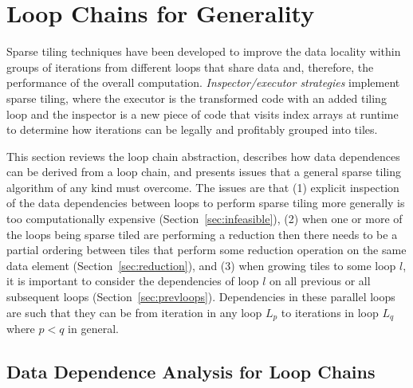 \section{Loop Chains for Generality}
\label{sec:loopchain}


Sparse tiling techniques have been developed 
to improve the data locality within groups
    of iterations from different loops that share data and,
therefore, the performance of the overall computation.  {\em
  Inspector/executor strategies} implement sparse
tiling, where the executor is the transformed code with an added
tiling loop and the inspector is a new piece of code that visits index
arrays at runtime to determine how iterations can be legally and
profitably grouped into tiles.



This section reviews the loop chain abstraction,
describes how data dependences can be
derived from a loop chain, 
and presents issues that a general sparse tiling
algorithm of any kind must overcome.
The issues are that 
 (1) explicit inspection of the data dependencies
between loops to perform sparse tiling more generally is too 
computationally expensive (Section~\ref{sec:infeasible}),
 (2) when one or more of the loops being sparse 
tiled are performing
a reduction then there needs to be a partial ordering 
between tiles that perform
some reduction operation on the same data element (Section~\ref{sec:reduction}), 
and (3) when growing tiles to some loop $l$, 
it is important to consider
the dependencies of loop $l$ on all previous or all subsequent loops
(Section~\ref{sec:prevloops}). 
Dependencies in these parallel loops are such that they can be from 
iteration in any loop $L_p$ to iterations in loop $L_q$ where $p<q$ in general.



\subsection{Data Dependence Analysis for Loop Chains}
\label{sec:loopchaindeps}

